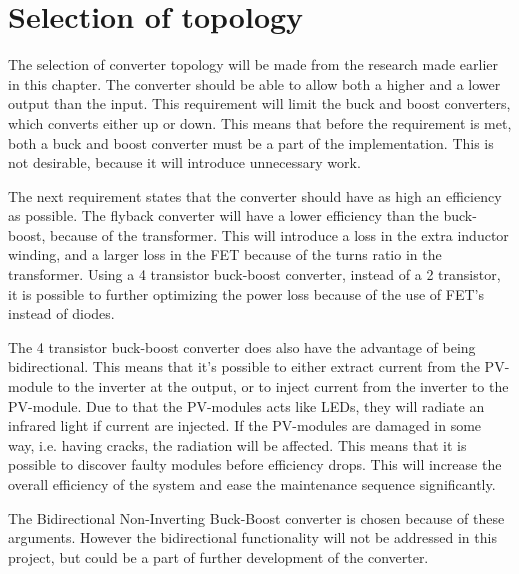 \section{Selection of topology}
The selection of converter topology will be made from the research made earlier in this chapter. The converter should be able to allow both a higher and a lower output than the input. This requirement will limit the buck and boost converters, which converts either up or down. This means that before the requirement is met, both a buck and boost converter must be a part of the implementation. This is not desirable, because it will introduce unnecessary work.  

The next requirement states that the converter should have as high an efficiency as possible. The flyback converter will have a lower efficiency than the buck-boost, because of the transformer. This will introduce a loss in the extra inductor winding, and a larger loss in the FET because of the turns ratio in the transformer. Using a 4 transistor buck-boost converter, instead of a 2 transistor, it is possible to further optimizing the power loss because of the use of FET's instead of diodes. 

The 4 transistor buck-boost converter does also have the advantage of being bidirectional. This means that it's possible to either extract current from the PV-module to the inverter at the output, or to inject current from the inverter to the PV-module. Due to that the PV-modules acts like LEDs, they will radiate an infrared light if current are injected. If the PV-modules are damaged in some way, i.e. having cracks, the radiation will be affected. This means that it is possible to discover faulty modules before efficiency drops. This will increase the overall efficiency of the system and ease the maintenance sequence significantly. 

The Bidirectional Non-Inverting Buck-Boost converter is chosen because of these arguments. However the bidirectional functionality will not be addressed in this project, but could be a part of further development of the converter. 






 